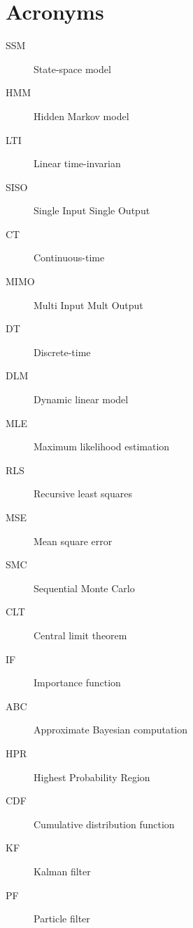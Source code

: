 \chapter{Acronyms}

\begin{description}
	\item[SSM] State-space model
    \item[HMM] Hidden Markov model
    \item[LTI] Linear time-invarian
    \item[SISO] Single Input Single Output
    \item[CT] Continuous-time
    \item[MIMO] Multi Input Mult Output
    \item[DT] Discrete-time
    \item[DLM] Dynamic linear model
    \item[MLE] Maximum likelihood estimation
    \item[RLS] Recursive least squares
    \item[MSE] Mean square error
    \item[SMC] Sequential Monte Carlo
    \item[CLT] Central limit theorem
    \item[IF] Importance function
    \item[ABC] Approximate Bayesian computation
    \item[HPR] Highest Probability Region
    \item[CDF] Cumulative distribution function
    \item[KF] Kalman filter
    \item[PF] Particle filter
\end{description}
